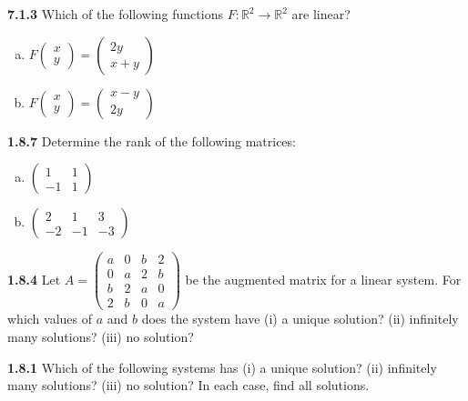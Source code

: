\documentclass{article}
\begin{document}
\textbf{7.1.3} Which of the following functions \(F: \mathbb{R}^2 \to \mathbb{R}^2\) are linear?
\begin{enumerate}[(a)]
    \item \(F\begin{pmatrix} x \\ y \end{pmatrix} = \begin{pmatrix} 2y \\ x+y \end{pmatrix}\)
    \item \(F\begin{pmatrix} x \\ y \end{pmatrix} = \begin{pmatrix} x-y \\ 2y \end{pmatrix}\)
\end{enumerate}
\vspace{10pt}


\textbf{1.8.7} Determine the rank of the following matrices:
\begin{enumerate}[(a)]
    \item \(\begin{pmatrix} 1 & 1 \\ -1 & 1 \end{pmatrix}\)
    \item \(\begin{pmatrix} 2 & 1 & 3 \\ -2 & -1 & -3 \end{pmatrix}\)
\end{enumerate}
\vspace{10pt}

\textbf{1.8.4} Let \(A = \begin{pmatrix} a & 0 & b & 2 \\ 0 & a & 2 & b \\ b & 2 & a & 0 \\ 2 & b & 0 & a \end{pmatrix}\) be the augmented matrix for a linear system. For which values of \(a\) and \(b\) does the system have (i) a unique solution? (ii) infinitely many solutions? (iii) no solution?
\vspace{10pt}

\textbf{1.8.1} Which of the following systems has (i) a unique solution? (ii) infinitely many solutions? (iii) no solution? In each case, find all solutions.
\vspace{10pt}
\end{document}
